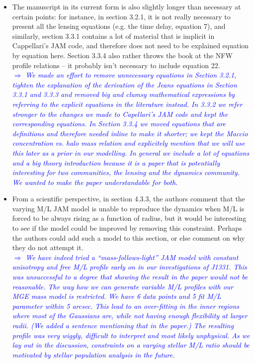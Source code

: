 \documentclass[10pt,a4paper]{article}
\newcommand{\Comment}[1]{\textsl{\textcolor{Blue}{$\Longrightarrow$ {#1}}}}
\begin{document}
\begin{itemize}
\item The manuscript in its current form is also slightly longer than necessary at certain
points: for instance, in section 3.2.1, it is not really necessary to present all
the lensing equations (e.g. the time delay, equation 7), and similarly, section
3.3.1 contains a lot of material that is implicit in Cappellari's JAM code, and
therefore does not need to be explained equation by equation here. Section 3.3.4
also rather throws the book at the NFW profile relations – it probably isn't
necessary to include equation 22. \\\Comment{We made an effort to remove unnecessary equations in Section 3.2.1, tighten the explanation of the derivation of the Jeans equations in Section 3.3.1 and 3.3.3 and removed big and clumsy mathematical expressions by referring to the explicit equations in the literature instead. In 3.3.2 we refer stronger to the changes we made to Capellari's JAM code and kept the corresponding equations. In Section 3.3.4 we moved equations that are definitions and therefore needed inline to make it shorter; we kept the Maccio concentration vs. halo mass relation and explicitely mention that we will use this later as a prior in our modelling. In general we include a lot of equations and a big theory introduction because it is a paper that is potentially interesting for two communities, the lensing and the dynamics community. We wanted to make the paper understandable for both.}

\item From a scientific perspective, in section 4.3.3, the authors comment that the
varying M/L JAM model is unable to reproduce the dynamics when M/L is forced to be
always rising as a function of radius, but it would be interesting to see if the
model could be improved by removing this constraint. Perhaps the authors could add
such a model to this section, or else comment on why they do not attempt it. \\\Comment{We have indeed tried a ``mass-follows-light'' JAM model with constant anisotropy and free M/L profile early on in our investigations of J1331. This was unsuccessful to a degree that showing the result in the paper would not be reasonable.  The way how we can generate variable M/L profiles with our MGE mass model is restricted. We have 6 data points and 5 fit M/L parameter within 5 arcsec. This lead to an over-fitting in the inner regions where most of the Gaussians are, while not having enough flexibility at larger radii. (We added a sentence mentioning that in the paper.) The resulting profile was very wiggly, difficult to interpret and most likely unphysical.  As we lay out in the discussion, constraints on a varying stellar M/L ratio should be motivated by stellar population analysis in the future.}


\end{itemize}
\end{document}
